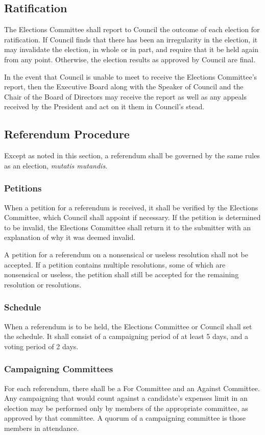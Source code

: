 \subsection{Ratification}
The Elections Committee shall report to Council the outcome of each election for
ratification. If Council finds that there has been an irregularity in the
election, it may invalidate the election, in whole or in part, and require that
it be held again from any point. Otherwise, the election results as approved by
Council are final.

In the event that Council is unable to meet to receive the Elections Committee's
report, then the Executive Board along with the Speaker of Council and the Chair of the Board of Directors  may receive the report as well as any appeals
received by the President and act on it them in Council's stead.

\subsection{Referendum Procedure}
Except as noted in this section, a referendum shall be governed by the same
rules as an election, \emph{mutatis mutandis}.

\subsubsection{Petitions}
When a petition for a referendum is received, it shall be verified by the
Elections Committee, which Council shall appoint if necessary. If the petition
is determined to be invalid, the Elections Committee shall return it to the
submitter with an explanation of why it was deemed invalid.

A petition for a referendum on a nonsensical or useless resolution shall not be
accepted. If a petition contains multiple resolutions, some of which are
nonsensical or useless, the petition shall still be accepted for the remaining
resolution or resolutions.

\subsubsection{Schedule}
When a referendum is to be held, the Elections Committee or Council shall set
the schedule. It shall consist of a campaigning period of at least 5 days, and a
voting period of 2 days.

\subsubsection{Campaigning Committees}
For each referendum, there shall be a For Committee and an Against Committee.
Any campaigning that would count against a candidate's expenses limit in an
election may be performed only by members of the appropriate committee, as
approved by that committee. A quorum of a campaigning committee is those members
in attendance.


